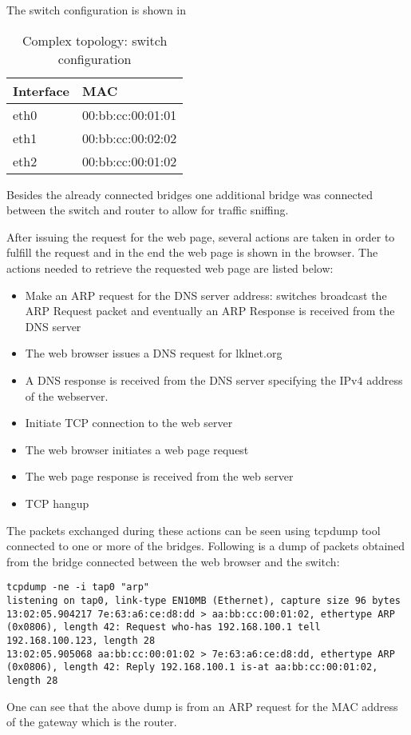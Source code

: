 The switch configuration is shown in 
\begin{center}
  \begin{table}[htb]
  \begin{center}
  \begin{tabular}{| l | l |}
    \hline
	Interface & MAC\\ \hline
	eth0 & 00:bb:cc:00:01:01\\ \hline
	eth1 & 00:bb:cc:00:02:02\\ \hline
	eth2 & 00:bb:cc:00:01:02\\
    \hline
  \end{tabular}
  \end{center}
  \caption{Complex topology: switch configuration}
  \label{table:complex-switch}
  \end{table}
\end{center}
Besides the already connected bridges one additional bridge was connected between the switch and router to allow for traffic sniffing.

After issuing the request for the web page, several actions are taken in order to fulfill the request and in the end the web page is shown in the browser.
The actions needed to retrieve the requested web page are listed below:
\begin{itemize}
	\item Make an ARP request for the DNS server address: switches broadcast the ARP Request packet and eventually an ARP Response is received from the DNS server
	\item The web browser issues a  DNS request for lklnet.org
	\item A DNS response is received from the DNS server specifying the IPv4 address of the webserver.
	\item Initiate TCP connection to the web server
	\item The web browser initiates a web page request
	\item The web page response is received from the web server
	\item TCP hangup
\end{itemize}
The packets exchanged during these actions can be seen using tcpdump tool connected to one or more of the bridges.
Following is a dump of packets obtained from the bridge connected between the web browser and the switch:
\lstset{language=TeX,caption=,label=tcpdump}
\begin{lstlisting}
tcpdump -ne -i tap0 "arp"
listening on tap0, link-type EN10MB (Ethernet), capture size 96 bytes
13:02:05.904217 7e:63:a6:ce:d8:dd > aa:bb:cc:00:01:02, ethertype ARP (0x0806), length 42: Request who-has 192.168.100.1 tell 192.168.100.123, length 28
13:02:05.905068 aa:bb:cc:00:01:02 > 7e:63:a6:ce:d8:dd, ethertype ARP (0x0806), length 42: Reply 192.168.100.1 is-at aa:bb:cc:00:01:02, length 28
\end{lstlisting}
One can see that the above dump is from an ARP request for the MAC address of the gateway which is the router. 


